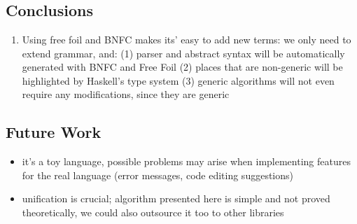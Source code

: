 \chapter{}
\label{chap:evaluation}



\section{Conclusions}

\begin{enumerate}
  \item Using free foil and BNFC makes its' easy to add new terms: we only need to extend grammar, and: (1) parser and abstract syntax will be automatically generated with BNFC and Free Foil (2) places that are non-generic will be highlighted by Haskell's type system (3) generic algorithms will not even require any modifications, since they are generic
\end{enumerate}

\section{Future Work}

\begin{itemize}
  \item it's a toy language, possible problems may arise when implementing features for the real language (error messages, code editing suggestions)
  \item unification is crucial; algorithm presented here is simple and not proved theoretically, we could also outsource it too to other libraries
\end{itemize}
